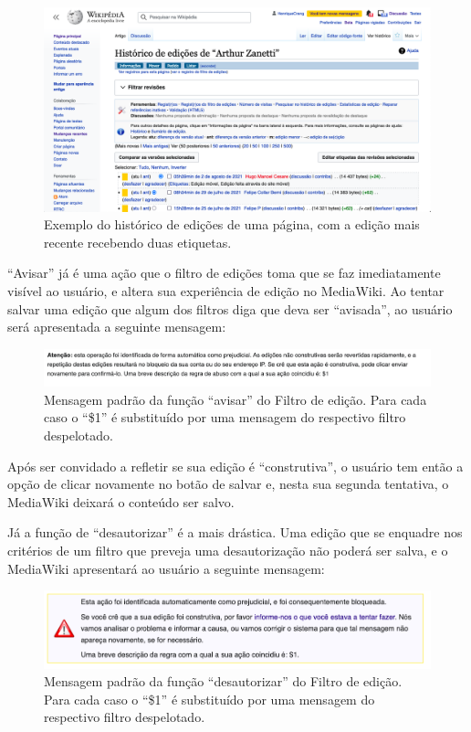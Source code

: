 \begin{figure}[H]
    \centering
    \includegraphics[width=1\textwidth]{Images/mediawiki_etiqueta.png}
    \caption{Exemplo do histórico de edições de uma página, com a edição mais recente recebendo duas etiquetas.}
    \label{fig:mediawiki_etiqueta}
\end{figure}

``Avisar'' já é uma ação que o filtro de edições toma que se faz imediatamente visível ao usuário, e altera sua experiência de edição no MediaWiki. Ao tentar salvar uma edição que algum dos filtros diga que deva ser ``avisada'', ao usuário será apresentada a seguinte mensagem:

\begin{figure}[H]
    \centering
    \includegraphics[width=1\textwidth]{Images/mediawiki_avisar.png}
    \caption{Mensagem padrão da função ``avisar'' do Filtro de edição. Para cada caso o ``\$1'' é substituído por uma mensagem do respectivo filtro despelotado. }
    \label{fig:mediawiki_avisar}
\end{figure}

Após ser convidado a refletir se sua edição é ``construtiva'', o usuário tem então a opção de clicar novamente no botão de salvar e, nesta sua segunda tentativa, o MediaWiki deixará o conteúdo ser salvo.

Já a função de ``desautorizar'' é a mais drástica. Uma edição que se enquadre nos critérios de um filtro que preveja uma desautorização não poderá ser salva, e o MediaWiki apresentará ao usuário a seguinte mensagem:

\begin{figure}[H]
    \centering
    \includegraphics[width=1\textwidth]{Images/mediawiki_desautorizar.png}
    \caption{Mensagem padrão da função ``desautorizar'' do Filtro de edição. Para cada caso o ``\$1'' é substituído por uma mensagem do respectivo filtro despelotado.}
    \label{fig:mediawiki_desautorizar}
\end{figure}

